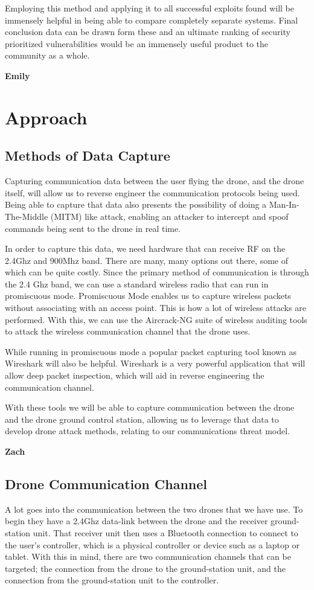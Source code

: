 \documentclass[IEEEtran,letterpaper,10pt,notitlepage,draftclsnofoot,onecolumn]{article}
\begin{document}
Employing this method and applying it to all successful exploits found will be immensely helpful in being able to compare completely separate systems.
Final conclusion data can be drawn form these and an ultimate ranking of security prioritized vulnerabilities would be an immensely useful product to the community as a whole.

\textbf{Emily}

\section{Approach}
\subsection{Methods of Data Capture}
Capturing communication data between the user flying the drone, and the drone itself, will allow us to reverse engineer
the communication protocols being used. Being able to capture that data also presents the possibility of doing a
Man-In-The-Middle (MITM) like attack, enabling an attacker to intercept and spoof commands being sent to the drone
in real time.

In order to capture this data, we need hardware that can receive RF on the 2.4Ghz and 900Mhz band. There are many, many
options out there, some of which can be quite costly. Since the primary method of communication is through the 2.4 Ghz
band, we can use a standard wireless radio that can run in promiscuous mode\cite{WiFiPerc}. Promiscuous Mode enables
us to capture wireless packets without associating with an access point. This is how a lot of wireless attacks are
performed\cite{WiFiPerc}. With this, we can use the Aircrack-NG suite of wireless auditing tools to attack the wireless
communication channel that the drone uses\cite{AircrackNG}.

While running in promiscuous mode a popular packet capturing tool known as Wireshark will also be helpful. Wireshark
is a very powerful application that will allow deep packet inspection, which will aid in reverse engineering the
communication channel\cite{WiFiPerc}.

With these tools we will be able to capture communication between the drone and the drone ground control station, allowing
us to leverage that data to develop drone attack methods, relating to our communications threat model.

\textbf{Zach}

\subsection{Drone Communication Channel}
A lot goes into the communication between the two drones that we have use.
To begin they have a 2.4Ghz data-link between the drone and the receiver ground-station unit.
That receiver unit then uses a Bluetooth connection to connect to the user's controller, which is a physical controller
or device such as a laptop or tablet.\cite{NazaM2} With this in mind, there are two communication channels that can be
targeted; the connection from the drone to the ground-station unit, and the connection from the ground-station unit
to the controller\cite{NazaM2}.
\end{document}
